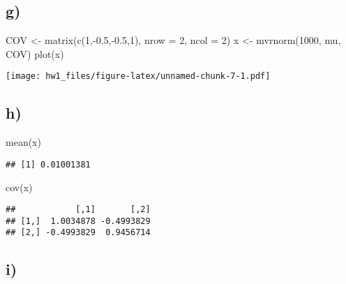\documentclass[
]{article}
\newenvironment{Shaded}{\begin{snugshade}}{\end{snugshade}}
\newcommand{\AttributeTok}[1]{\textcolor[rgb]{0.77,0.63,0.00}{#1}}
\newcommand{\DecValTok}[1]{\textcolor[rgb]{0.00,0.00,0.81}{#1}}
\newcommand{\FloatTok}[1]{\textcolor[rgb]{0.00,0.00,0.81}{#1}}
\newcommand{\FunctionTok}[1]{\textcolor[rgb]{0.00,0.00,0.00}{#1}}
\newcommand{\NormalTok}[1]{#1}
\newcommand{\OtherTok}[1]{\textcolor[rgb]{0.56,0.35,0.01}{#1}}
\newcommand{\SpecialCharTok}[1]{\textcolor[rgb]{0.00,0.00,0.00}{#1}}
\begin{document}
\hypertarget{g}{%
\subsection{g)}\label{g}}

\begin{Shaded}
\begin{Highlighting}[]
\NormalTok{COV }\OtherTok{\textless{}{-}} \FunctionTok{matrix}\NormalTok{(}\FunctionTok{c}\NormalTok{(}\DecValTok{1}\NormalTok{,}\SpecialCharTok{{-}}\FloatTok{0.5}\NormalTok{,}\SpecialCharTok{{-}}\FloatTok{0.5}\NormalTok{,}\DecValTok{1}\NormalTok{), }\AttributeTok{nrow =} \DecValTok{2}\NormalTok{, }\AttributeTok{ncol =} \DecValTok{2}\NormalTok{)}
\NormalTok{x }\OtherTok{\textless{}{-}} \FunctionTok{mvrnorm}\NormalTok{(}\DecValTok{1000}\NormalTok{, mu, COV)}
\FunctionTok{plot}\NormalTok{(x)}
\end{Highlighting}
\end{Shaded}

\texttt{[image: hw1\_files/figure-latex/unnamed-chunk-7-1.pdf]}

\hypertarget{h}{%
\subsection{h)}\label{h}}

\begin{Shaded}
\begin{Highlighting}[]
\FunctionTok{mean}\NormalTok{(x)}
\end{Highlighting}
\end{Shaded}

\begin{verbatim}
## [1] 0.01001381
\end{verbatim}

\begin{Shaded}
\begin{Highlighting}[]
\FunctionTok{cov}\NormalTok{(x)}
\end{Highlighting}
\end{Shaded}

\begin{verbatim}
##            [,1]       [,2]
## [1,]  1.0034878 -0.4993829
## [2,] -0.4993829  0.9456714
\end{verbatim}

\hypertarget{i}{%
\subsection{i)}\label{i}}
\end{document}
